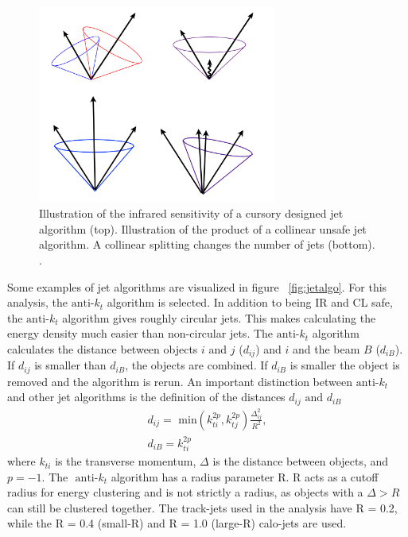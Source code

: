 \begin{figure}[h]
\begin{center}
\includegraphics*[width=0.70\textwidth] {figures/IR_CL_safe}
\caption[Illustration of Infrared and collinear safety]{Illustration of the infrared sensitivity of a cursory designed jet algorithm (top). Illustration of the product of a collinear unsafe jet algorithm. A collinear splitting changes the number of jets (bottom). \cite{Isildak:2013kfa}.}
\label{fig:IR_CL}
\end{center}
\end{figure}

\indent Some examples of jet algorithms are visualized in figure ~\ref{fig:jetalgo}. For this analysis, the ${\text{anti-}k_{t}}$ algorithm is selected. In addition to being IR and CL safe, the ${\text{anti-}k_{t}}$ algorithm gives roughly circular jets. This makes calculating the energy density much easier than non-circular jets. The ${\text{anti-}k_{t}}$ algorithm calculates the distance between objects $i$ and $j$ ($d_{ij}$) and $i$ and the beam $B$ ($d_{iB}$). If ${d_{ij}}$ is smaller than ${d_{iB}}$, the objects are combined. If ${d_{iB}}$ is smaller the object is removed and the algorithm is rerun. An important distinction between ${\textrm{anti-}k_{t}}$ and other jet algorithms is the definition of the distances ${d_{ij}\text{ and } d_{iB}}$
\begin{equation}
\begin{split}
d_{ij} = \text{ min}(k^{2p}_{ti},k^{2p}_{tj})\frac{\Delta^{2}_{ij}}{R^{2}},\\
d_{iB} = k^{2p}_{ti}
\end{split}
\end{equation}
where ${k_{ti}}$ is the transverse momentum, ${\Delta}$ is the distance between objects, and ${p=-1}$. The ${\text{ anti-}k_{t}}$ algorithm has a radius parameter R. R acts as a cutoff radius for energy clustering and is not strictly a radius, as objects with a ${\Delta > R}$ can still be clustered together. The track-jets used in the analysis have R = 0.2, while the R = 0.4 (small-R) and R = 1.0 (large-R) calo-jets are used. 
